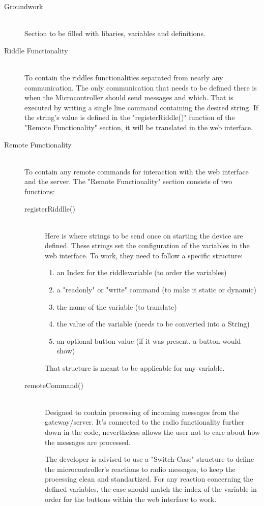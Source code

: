 \begin{description}
	\item [Groundwork]\hfill \\
	      Section to be filled with libaries, variables and definitions.
	\item [Riddle Functionality]\hfill \\
	      To contain the riddles functionalities separated from nearly any communication.
	      The only communication that needs to be defined there is when the Microcontroller should send messages and which.
	      That is executed by writing a single line command containing the desired string.
	      If the string's value is defined in the "registerRiddle()" function of the "Remote Functionality" section, it will be translated in the web interface.

	\item [Remote Functionality]\hfill \\
	      To contain any remote commands for interaction with the web interface and the server.
	      The "Remote Functionality" section consists of two functions:
	      \begin{description}
		      \item [registerRiddlle()]\hfill \\
		            Here is where strings to be send once on starting the device are defined.
		            These strings set the configuration of the variables in the web interface.
		            To work, they need to follow a specific structure:
		            \begin{enumerate}
			            \item an Index for the riddlevariable (to order the variables)
			            \item a "readonly" or "write" command (to make it static or dynamic)
			            \item the name of the variable (to translate)
			            \item the value of the variable (needs to be converted into a String)
			            \item an optional button value (if it was present, a button would show)
		            \end{enumerate}
		            That structure is meant to be applieable for any variable.
		      \item[remoteCommand()]\hfill \\
					Designed to contain processing of incoming messages from the gateway/server.
		            It's connected to the radio functionality further down in the code, nevertheless allows the user not to care about how the messages are processed.

		            The developer is advised to use a "Switch-Case" structure to define the microcontroller's reactions to radio messages, to keep the processing clean and standartized.
		            For any reaction concerning the defined variables, the case should match the index of the variable in order for the buttons within the web interface to work.

	      \end{description}

\end{description}
